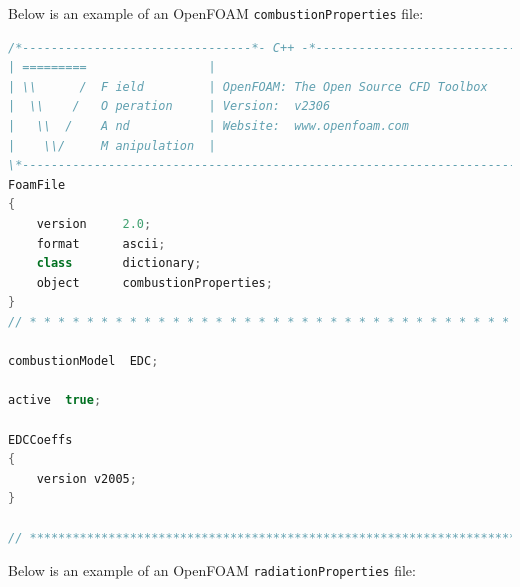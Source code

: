 
Below is an example of an OpenFOAM \texttt{combustionProperties} file:

\begin{lstlisting}[language=C++, caption={combustionProperties}]
/*--------------------------------*- C++ -*----------------------------------*\
| =========                 |                                                 |
| \\      /  F ield         | OpenFOAM: The Open Source CFD Toolbox           |
|  \\    /   O peration     | Version:  v2306                                 |
|   \\  /    A nd           | Website:  www.openfoam.com                      |
|    \\/     M anipulation  |                                                 |
\*---------------------------------------------------------------------------*/
FoamFile
{
    version     2.0;
    format      ascii;
    class       dictionary;
    object      combustionProperties;
}
// * * * * * * * * * * * * * * * * * * * * * * * * * * * * * * * * * * * * * //

combustionModel  EDC;

active  true;

EDCCoeffs
{
    version v2005;
}

// ************************************************************************* //
\end{lstlisting}


Below is an example of an OpenFOAM \texttt{radiationProperties} file:

